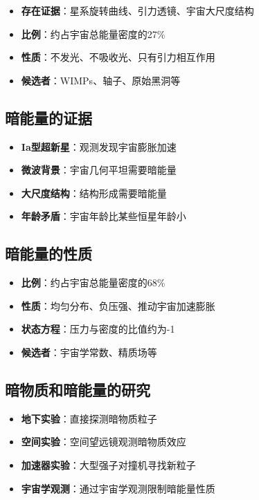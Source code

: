 \documentclass[12pt,UTF8]{ctexbook}
\begin{document}
\begin{itemize}
  \item \textbf{存在证据}：星系旋转曲线、引力透镜、宇宙大尺度结构
  \item \textbf{比例}：约占宇宙总能量密度的27\%
  \item \textbf{性质}：不发光、不吸收光、只有引力相互作用
  \item \textbf{候选者}：WIMPs、轴子、原始黑洞等
\end{itemize}

\subsection{暗能量的证据}

\begin{itemize}
  \item \textbf{Ia型超新星}：观测发现宇宙膨胀加速
  \item \textbf{微波背景}：宇宙几何平坦需要暗能量
  \item \textbf{大尺度结构}：结构形成需要暗能量
  \item \textbf{年龄矛盾}：宇宙年龄比某些恒星年龄小
\end{itemize}

\subsection{暗能量的性质}

\begin{itemize}
  \item \textbf{比例}：约占宇宙总能量密度的68\%
  \item \textbf{性质}：均匀分布、负压强、推动宇宙加速膨胀
  \item \textbf{状态方程}：压力与密度的比值约为-1
  \item \textbf{候选者}：宇宙学常数、精质场等
\end{itemize}

\subsection{暗物质和暗能量的研究}

\begin{itemize}
  \item \textbf{地下实验}：直接探测暗物质粒子
  \item \textbf{空间实验}：空间望远镜观测暗物质效应
  \item \textbf{加速器实验}：大型强子对撞机寻找新粒子
  \item \textbf{宇宙学观测}：通过宇宙学观测限制暗能量性质
\end{itemize}
\end{document}
